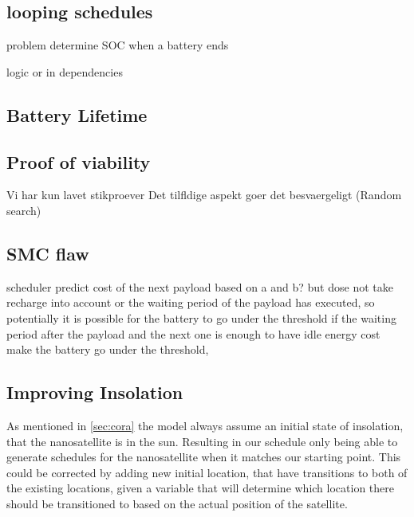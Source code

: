 \subsection{looping schedules}
problem determine SOC when a battery ends 

logic or in dependencies

\subsection{Battery Lifetime} \label{subsec:disc_life}



\subsection{Proof of viability}
Vi har kun lavet stikproever
Det tilfldige aspekt goer det besvaergeligt (Random search)

\subsection{SMC flaw}
scheduler predict cost of the next payload based on a and b? but dose not take recharge into account or the waiting period of the payload has executed, so potentially it is possible for the battery to go under the threshold if the waiting period after the payload and the next one is enough to have idle energy cost make the battery go under the threshold,  

\subsection{Improving Insolation}
As mentioned in \cref{sec:cora} the model always assume an initial state of insolation, that the nanosatellite is in the sun. Resulting in our schedule only being able to generate schedules for the nanosatellite when it matches our starting point.
This could be corrected by adding new initial location, that have transitions to both of the existing locations, given a variable that will determine which location there should be transitioned to based on the actual position of the satellite.
